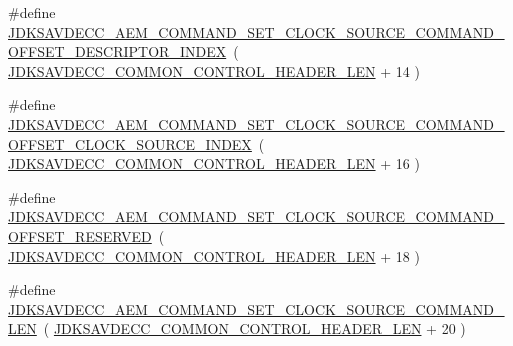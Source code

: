 \begin{DoxyCompactItemize}
\item 
\#define \hyperlink{group__command__set__clock__source_gaca73ec784a2a8f6720854ed8815734cc}{J\+D\+K\+S\+A\+V\+D\+E\+C\+C\+\_\+\+A\+E\+M\+\_\+\+C\+O\+M\+M\+A\+N\+D\+\_\+\+S\+E\+T\+\_\+\+C\+L\+O\+C\+K\+\_\+\+S\+O\+U\+R\+C\+E\+\_\+\+C\+O\+M\+M\+A\+N\+D\+\_\+\+O\+F\+F\+S\+E\+T\+\_\+\+D\+E\+S\+C\+R\+I\+P\+T\+O\+R\+\_\+\+I\+N\+D\+EX}~( \hyperlink{group__jdksavdecc__avtp__common__control__header_gaae84052886fb1bb42f3bc5f85b741dff}{J\+D\+K\+S\+A\+V\+D\+E\+C\+C\+\_\+\+C\+O\+M\+M\+O\+N\+\_\+\+C\+O\+N\+T\+R\+O\+L\+\_\+\+H\+E\+A\+D\+E\+R\+\_\+\+L\+EN} + 14 )
\item 
\#define \hyperlink{group__command__set__clock__source_ga13e43f68e3de6cf18534c5e0c8c54054}{J\+D\+K\+S\+A\+V\+D\+E\+C\+C\+\_\+\+A\+E\+M\+\_\+\+C\+O\+M\+M\+A\+N\+D\+\_\+\+S\+E\+T\+\_\+\+C\+L\+O\+C\+K\+\_\+\+S\+O\+U\+R\+C\+E\+\_\+\+C\+O\+M\+M\+A\+N\+D\+\_\+\+O\+F\+F\+S\+E\+T\+\_\+\+C\+L\+O\+C\+K\+\_\+\+S\+O\+U\+R\+C\+E\+\_\+\+I\+N\+D\+EX}~( \hyperlink{group__jdksavdecc__avtp__common__control__header_gaae84052886fb1bb42f3bc5f85b741dff}{J\+D\+K\+S\+A\+V\+D\+E\+C\+C\+\_\+\+C\+O\+M\+M\+O\+N\+\_\+\+C\+O\+N\+T\+R\+O\+L\+\_\+\+H\+E\+A\+D\+E\+R\+\_\+\+L\+EN} + 16 )
\item 
\#define \hyperlink{group__command__set__clock__source_ga64a8aefaa4667020f01e76055a88e39f}{J\+D\+K\+S\+A\+V\+D\+E\+C\+C\+\_\+\+A\+E\+M\+\_\+\+C\+O\+M\+M\+A\+N\+D\+\_\+\+S\+E\+T\+\_\+\+C\+L\+O\+C\+K\+\_\+\+S\+O\+U\+R\+C\+E\+\_\+\+C\+O\+M\+M\+A\+N\+D\+\_\+\+O\+F\+F\+S\+E\+T\+\_\+\+R\+E\+S\+E\+R\+V\+ED}~( \hyperlink{group__jdksavdecc__avtp__common__control__header_gaae84052886fb1bb42f3bc5f85b741dff}{J\+D\+K\+S\+A\+V\+D\+E\+C\+C\+\_\+\+C\+O\+M\+M\+O\+N\+\_\+\+C\+O\+N\+T\+R\+O\+L\+\_\+\+H\+E\+A\+D\+E\+R\+\_\+\+L\+EN} + 18 )
\item 
\#define \hyperlink{group__command__set__clock__source_gabe32145cd4083996fb7ca0cc20922ae2}{J\+D\+K\+S\+A\+V\+D\+E\+C\+C\+\_\+\+A\+E\+M\+\_\+\+C\+O\+M\+M\+A\+N\+D\+\_\+\+S\+E\+T\+\_\+\+C\+L\+O\+C\+K\+\_\+\+S\+O\+U\+R\+C\+E\+\_\+\+C\+O\+M\+M\+A\+N\+D\+\_\+\+L\+EN}~( \hyperlink{group__jdksavdecc__avtp__common__control__header_gaae84052886fb1bb42f3bc5f85b741dff}{J\+D\+K\+S\+A\+V\+D\+E\+C\+C\+\_\+\+C\+O\+M\+M\+O\+N\+\_\+\+C\+O\+N\+T\+R\+O\+L\+\_\+\+H\+E\+A\+D\+E\+R\+\_\+\+L\+EN} + 20 )
\end{DoxyCompactItemize}
